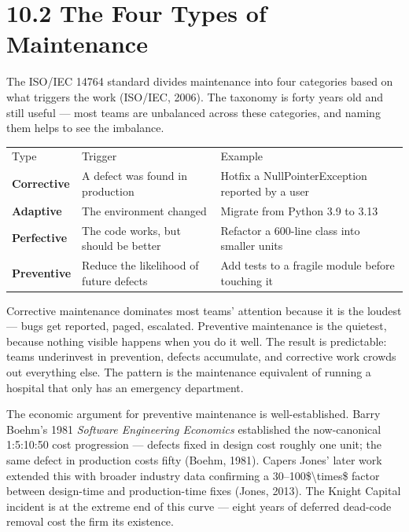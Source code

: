 \documentclass[11pt,a4paper]{book}
\begin{document}
\medskip

\section{10.2 The Four Types of Maintenance}

The ISO/IEC 14764 standard divides maintenance into four categories based on what triggers the work (ISO/IEC, 2006). The taxonomy is forty years old and still useful --- most teams are unbalanced across these categories, and naming them helps to see the imbalance.

\begin{tabular}{lll}
\hline
Type & Trigger & Example \\
\textbf{Corrective} & A defect was found in production & Hotfix a NullPointerException reported by a user \\
\textbf{Adaptive} & The environment changed & Migrate from Python 3.9 to 3.13 \\
\textbf{Perfective} & The code works, but should be better & Refactor a 600-line class into smaller units \\
\textbf{Preventive} & Reduce the likelihood of future defects & Add tests to a fragile module before touching it \\
\hline
\end{tabular}

Corrective maintenance dominates most teams' attention because it is the loudest --- bugs get reported, paged, escalated. Preventive maintenance is the quietest, because nothing visible happens when you do it well. The result is predictable: teams underinvest in prevention, defects accumulate, and corrective work crowds out everything else. The pattern is the maintenance equivalent of running a hospital that only has an emergency department.

The economic argument for preventive maintenance is well-established. Barry Boehm's 1981 \textit{Software Engineering Economics} established the now-canonical 1:5:10:50 cost progression --- defects fixed in design cost roughly one unit; the same defect in production costs fifty (Boehm, 1981). Capers Jones' later work extended this with broader industry data confirming a 30--100\$\textbackslash{}times\$ factor between design-time and production-time fixes (Jones, 2013). The Knight Capital incident is at the extreme end of this curve --- eight years of deferred dead-code removal cost the firm its existence.

\medskip
\end{document}
